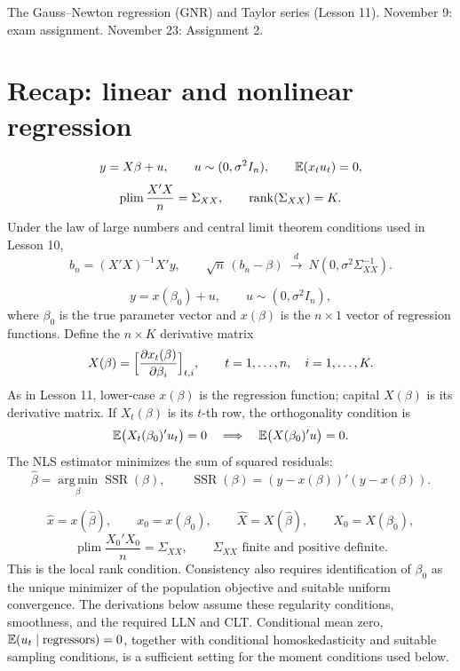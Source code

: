 \documentclass[11pt]{article}
\begin{document}

 The Gauss--Newton regression (GNR) and Taylor series (Lesson 11).
 November 9: exam assignment. November 23: Assignment 2.

\section{Recap: linear and nonlinear regression}

\[ y = X\beta + u, \qquad u \sim (0,\sigma^{2}I_{n}), \qquad
   \mathbb{E}(x_{t}u_{t}) = 0, \]
\[ \operatorname*{plim}\frac{X'X}{n} = \Sigma_{XX}, \qquad
   \operatorname{rank}(\Sigma_{XX}) = K. \]
Under the law of large numbers and central limit theorem conditions used in Lesson 10,
\[ b_{n} = (X'X)^{-1}X'y, \qquad
   \sqrt{n}\,(b_{n}-\beta) \ \xrightarrow{\ d\ }\ N(0,\sigma^{2}\Sigma_{XX}^{-1}). \]

\[ y = x(\beta_{0}) + u, \qquad u \sim (0,\sigma^{2}I_{n}), \]
where $\beta_{0}$ is the true parameter vector and $x(\beta)$ is the $n\times 1$
vector of regression functions. Define the $n\times K$ derivative matrix
\[ X(\beta) = \Bigl[\frac{\partial x_{t}(\beta)}{\partial\beta_{i}}\Bigr]_{t,i},
   \qquad t=1,\ldots,n,\quad i=1,\ldots,K. \]
As in Lesson 11, lower-case $x(\beta)$ is the regression function; capital
$X(\beta)$ is its derivative matrix. If $X_{t}(\beta)$ is its $t$-th row, the
orthogonality condition is
\[ \mathbb{E}\bigl(X_{t}(\beta_{0})'u_{t}\bigr)=0
   \quad\Longrightarrow\quad \mathbb{E}\bigl(X(\beta_{0})'u\bigr)=0. \]
The NLS estimator minimizes the sum of squared residuals:
\[ \hat\beta = \operatorname*{arg\,min}_{\beta}\operatorname{SSR}(\beta),
   \qquad \operatorname{SSR}(\beta)=(y-x(\beta))'(y-x(\beta)). \]

\[ \hat x=x(\hat\beta), \qquad x_{0}=x(\beta_{0}), \qquad
   \hat X=X(\hat\beta), \qquad X_{0}=X(\beta_{0}), \]
\[ \operatorname*{plim}\frac{X_{0}'X_{0}}{n}=\Sigma_{XX},
   \qquad \Sigma_{XX}\text{ finite and positive definite}. \]
This is the local rank condition. Consistency also requires identification of
$\beta_{0}$ as the unique minimizer of the population objective and suitable
uniform convergence. The derivations below assume these regularity conditions,
smoothness, and the required LLN and CLT. Conditional mean zero,
$\mathbb{E}(u_{t}\mid\text{regressors})=0$, together with conditional homoskedasticity
and suitable sampling conditions, is a sufficient setting for the moment
conditions used below.
\end{document}

